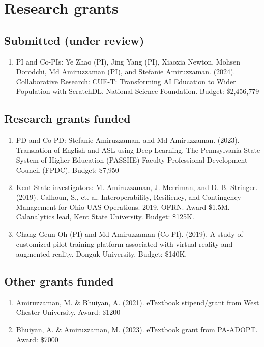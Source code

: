 \documentclass{article}
\begin{document}
\section*{Research grants}\vspace{-0.5em}
\subsection*{Submitted (under review)}
\begin{enumerate}
    \item PI and Co-PIs: Ye Zhao (PI), Jing Yang (PI), Xiaoxia Newton, Mohsen Dorodchi, Md 	Amiruzzaman (PI), and Stefanie Amiruzzaman. (2024). Collaborative Research: CUE-T: Transforming AI Education to Wider Population with ScratchDL. National Science 	Foundation. Budget: \$2,456,779
\end{enumerate}


\subsection*{Research grants funded} \vspace{-0.5em}
\begin{enumerate}[topsep=0pt,itemsep=-1ex,partopsep=0ex,parsep=1ex, resume]
    \item PD and Co-PD: Stefanie Amiruzzaman, and Md Amiruzzaman. (2023). Translation of English and ASL using Deep Learning. The Pennsylvania State System of Higher Education 	(PASSHE) Faculty Professional Development Council (FPDC). Budget: \$7,950
    \item Kent State investigators: M. Amiruzzaman, J. Merriman, and D. B. Stringer. (2019). Calhoun, 	S., et. al. Interoperability, Resiliency, and Contingency Management for Ohio UAS 	Operations. 2019. OFRN. Award \$1.5M. Calanalytics lead, Kent State University. Budget: \$125K. 
    \item Chang-Geun Oh (PI) and Md Amiruzzaman (Co-PI). (2019). A study of customized pilot training platform associated with virtual reality and augmented reality. Donguk 	University. Budget: \$140K.
\end{enumerate}
\subsection*{Other grants funded}\vspace{-0.5em}
\begin{enumerate}[topsep=0pt,itemsep=-1ex,partopsep=0ex,parsep=1ex, resume]
    \item Amiruzzaman, M. \& Bhuiyan, A. (2021). eTextbook stipend/grant from West Chester University. Award: \$1200
    \item Bhuiyan, A. \& Amiruzzaman, M. (2023). eTextbook grant from PA-ADOPT. Award: \$7000
\end{enumerate}
\end{document}
